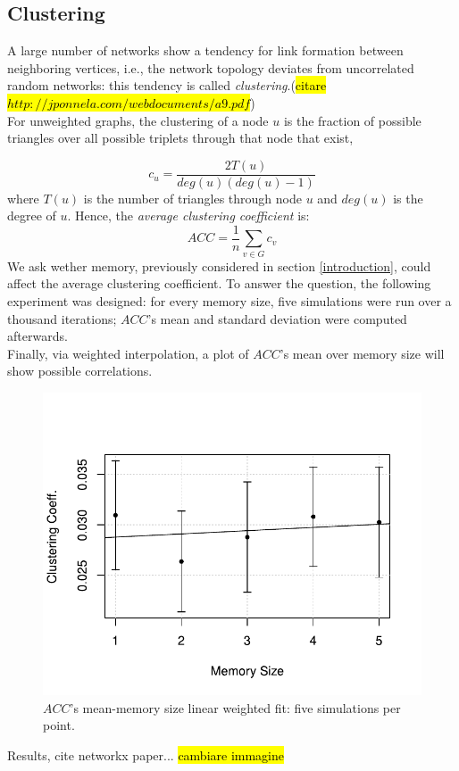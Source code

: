 \subsection{Clustering} \label{clustering}
A large number of networks show a tendency for link formation between neighboring vertices, i.e., the network topology deviates from uncorrelated random networks: this tendency is called \textit{clustering}.(\hl{citare $http://jponnela.com/webdocuments/a9.pdf$}) \\
For unweighted graphs, the clustering of a node $u$ is the fraction of possible triangles over all possible triplets  through that node that exist,

\begin{equation}
\label{eq:clustering}
c_u = \frac{2 T(u)}{deg(u)(deg(u)-1)}
\end{equation}
where $T(u)$ is the number of triangles through node $u$ and $deg(u)$ is the degree of $u$.
Hence, the \textit{average clustering coefficient}  is:
\begin{equation}
\label{eq:average_clustering}
ACC = \frac{1}{n}\sum_{v \in G} c_v
\end{equation}
We ask wether memory, previously considered in section \ref{introduction}, could affect the average clustering coefficient.
To answer the question, the following experiment was designed:
for every memory size, five simulations were run over a thousand iterations; $ACC$'s mean and standard deviation were computed afterwards.\\
Finally, via weighted interpolation, a plot of $ACC$'s mean over memory size will show possible correlations. 
\begin{figure}[h]
  \centering
  \includegraphics[trim={0cm 0cm 0cm 1cm},clip,width=.8\columnwidth]{img/clustering.pdf}
  \caption{$ACC$'s mean-memory size linear weighted fit: five simulations per point.}
  \label{fig:clustering}
\end{figure}
Results, cite networkx paper...
\hl{cambiare immagine}